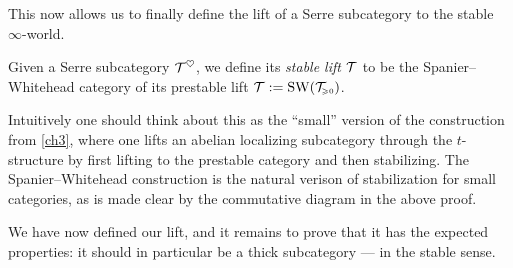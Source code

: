 This now allows us to finally define the lift of a Serre subcategory to the stable $\infty$-world. 

\begin{definition}
    Given a Serre subcategory $\mathcal{T}^\heartsuit$, we define its \emph{stable lift} $\mathcal{T}$ to be the Spanier--Whitehead category of its prestable lift $\mathcal{T}:= \operatorname{SW}(\mathcal{T}_{\hspace{-1pt}\scriptscriptstyle\geqslant 0})$. 
\end{definition}

\begin{remark}
    Intuitively one should think about this as the ``small'' version of the construction from \cref{ch3}, where one lifts an abelian localizing subcategory through the $t$-structure by first lifting to the prestable category and then stabilizing. The Spanier--Whitehead construction is the natural verison of stabilization for small categories, as is made clear by the commutative diagram in the above proof. 
\end{remark}

We have now defined our lift, and it remains to prove that it has the expected properties: it should in particular be a thick subcategory --- in the stable sense. 

